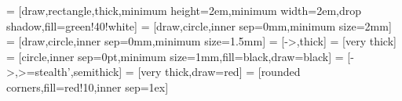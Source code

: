 \usepackage{pgfplots}

\usetikzlibrary{arrows}
\usetikzlibrary{shadows}
\usetikzlibrary{positioning}
\usetikzlibrary{calc}
\usetikzlibrary{patterns}


 = [draw,rectangle,thick,minimum height=2em,minimum width=2em,drop shadow,fill=green!40!white]
 = [draw,circle,inner sep=0mm,minimum size=2mm]
 = [draw,circle,inner sep=0mm,minimum size=1.5mm]
 = [->,thick]
 = [very thick]
 = [circle,inner sep=0pt,minimum size=1mm,fill=black,draw=black]
 = [->,>=stealth',semithick]
 = [very thick,draw=red]
 = [rounded corners,fill=red!10,inner sep=1ex]